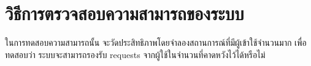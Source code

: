 \section{วิธีการตรวจสอบความสามารถของระบบ}
ในการทดสอบความสามารถนั้น จะวัดประสิทธิภาพโดยจำลองสถานการณ์ที่มีผู้เข้าใช้จำนวนมาก เพื่อทดสอบว่า ระบบจะสามารถรองรับ requests จากผู้ใช้ในจำนวนที่คาดหวังไว้ได้หรือไม่